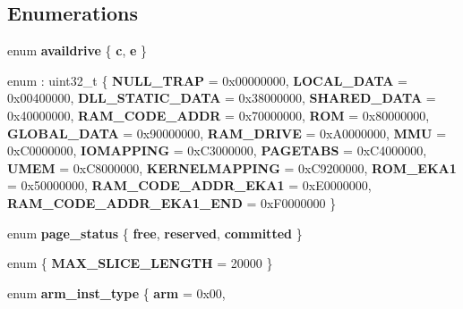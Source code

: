 \subsection*{Enumerations}
\begin{DoxyCompactItemize}
\item 
\mbox{\label{namespaceeka2l1_a871b5f5b5985d2194660aa5b6f4570d4}} 
enum {\bfseries availdrive} \{ {\bfseries c}, 
{\bfseries e}
 \}
\item 
\mbox{\label{namespaceeka2l1_acdfd4318ef110b2ea1eeaaeb12e41cf0}} 
enum \+: uint32\+\_\+t \{ \newline
{\bfseries N\+U\+L\+L\+\_\+\+T\+R\+AP} = 0x00000000, 
{\bfseries L\+O\+C\+A\+L\+\_\+\+D\+A\+TA} = 0x00400000, 
{\bfseries D\+L\+L\+\_\+\+S\+T\+A\+T\+I\+C\+\_\+\+D\+A\+TA} = 0x38000000, 
{\bfseries S\+H\+A\+R\+E\+D\+\_\+\+D\+A\+TA} = 0x40000000, 
\newline
{\bfseries R\+A\+M\+\_\+\+C\+O\+D\+E\+\_\+\+A\+D\+DR} = 0x70000000, 
{\bfseries R\+OM} = 0x80000000, 
{\bfseries G\+L\+O\+B\+A\+L\+\_\+\+D\+A\+TA} = 0x90000000, 
{\bfseries R\+A\+M\+\_\+\+D\+R\+I\+VE} = 0x\+A0000000, 
\newline
{\bfseries M\+MU} = 0x\+C0000000, 
{\bfseries I\+O\+M\+A\+P\+P\+I\+NG} = 0x\+C3000000, 
{\bfseries P\+A\+G\+E\+T\+A\+BS} = 0x\+C4000000, 
{\bfseries U\+M\+EM} = 0x\+C8000000, 
\newline
{\bfseries K\+E\+R\+N\+E\+L\+M\+A\+P\+P\+I\+NG} = 0x\+C9200000, 
{\bfseries R\+O\+M\+\_\+\+E\+K\+A1} = 0x50000000, 
{\bfseries R\+A\+M\+\_\+\+C\+O\+D\+E\+\_\+\+A\+D\+D\+R\+\_\+\+E\+K\+A1} = 0x\+E0000000, 
{\bfseries R\+A\+M\+\_\+\+C\+O\+D\+E\+\_\+\+A\+D\+D\+R\+\_\+\+E\+K\+A1\+\_\+\+E\+ND} = 0x\+F0000000
 \}
\item 
\mbox{\label{namespaceeka2l1_a1e4267e4be08ff47fdae943bda08e29c}} 
enum {\bfseries page\+\_\+status} \{ {\bfseries free}, 
{\bfseries reserved}, 
{\bfseries committed}
 \}
\item 
\mbox{\label{namespaceeka2l1_aa443f10452d0ca7ee7ffb5d29a5096b7}} 
enum \{ {\bfseries M\+A\+X\+\_\+\+S\+L\+I\+C\+E\+\_\+\+L\+E\+N\+G\+TH} = 20000
 \}
\item 
\mbox{\label{namespaceeka2l1_a65682843644b2123d6a08c3e727c1d7e}} 
enum {\bfseries arm\+\_\+inst\+\_\+type} \{ {\bfseries arm} = 0x00, 

\end{DoxyCompactItemize}

